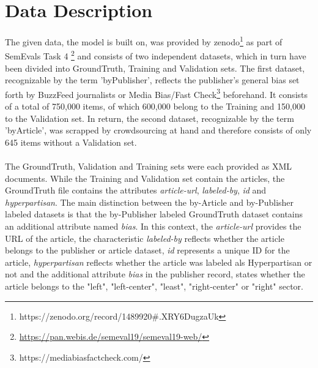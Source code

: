 \documentclass[a4paper, 11pt,titlepage,oneside,openany]{book}
\begin{document}
\chapter{Data Description}
\indent The given data, the model is built on, was provided by zenodo\footnote{https://zenodo.org/record/1489920\#.XRY6DugzaUk} as part of SemEvals Task 4 \footnote{\url{https://pan.webis.de/semeval19/semeval19-web/}} and consists of two independent datasets, which in turn have been divided into GroundTruth, Training and Validation sets.
The first dataset, recognizable by the term 'byPublisher', reflects the publisher's general bias set forth by BuzzFeed journalists or Media Bias/Fast Check\footnote{https://mediabiasfactcheck.com/} beforehand. It consists of a total of 750,000 items, of which 600,000 belong to the Training and 150,000 to the Validation set.
In return, the second dataset, recognizable by the term 'byArticle', was scrapped by crowdsourcing at hand and therefore consists of only 645 items without a Validation set.\\
 \\
\indent The GroundTruth, Validation and Training sets were each provided as XML documents. While the Training and Validation set contain the articles, the GroundTruth file contains the attributes \textit{article-url}, \textit{labeled-by}, \textit{id} and \textit{hyperpartisan}. The main distinction between the by-Article and by-Publisher labeled datasets is that the by-Publisher labeled GroundTruth dataset contains an additional attribute named \textit{bias}. In this context, the \textit{article-url} provides the URL of the article, the characteristic \textit{labeled-by} reflects whether the article belongs to the publisher or article dataset, \textit{id} represents a unique ID for the article, \textit{hyperpartisan} reflects whether the article was labeled als Hyperpartisan or not and the additional attribute \textit{bias} in the publisher record, states whether the article belongs to the "left", "left-center", "least", "right-center" or "right" sector.
 
\newpage
\end{document}

